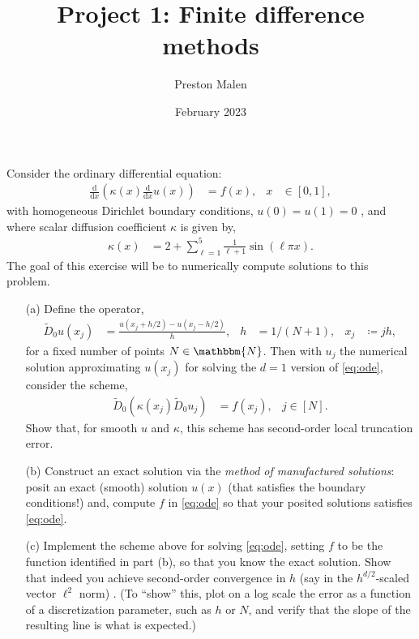 \documentclass[11pt,reqno]{amsart}
\title{Project 1: Finite difference methods}
\author{Preston Malen}
\date{February 2023}
\newcommand{\mathd}{\textrm{d}}
\newcommand{\ddx}[1]{\frac{\mathd}{\mathd #1}}
\newcommand{\N}{\mathbbm{N}}
\begin{document}
\maketitle

\noindent Consider the ordinary differential equation:
\begin{align}\label{eq:ode}
  \ddx{x} \left(\kappa(x) \ddx{x} u(x) \right) &= f(x), & x &\in [0,1],
\end{align}
with homogeneous Dirichlet boundary conditions, $u(0) = u(1) = 0$ , and where scalar diffusion coefficient $\kappa$ is given by,
  \begin{align*}
    \kappa(x) &= 2 + \sum_{\ell=1}^{5} \frac{1}{\ell+1} \sin( \ell \pi x ).
  \end{align*}
  The goal of this exercise will be to numerically compute solutions to this problem. \\[8pt]
  \begin{itemize}
    \item[(a)] Define the operator,
      \begin{align*}
        \widetilde{D}_0 u(x_j) &= \frac{u(x_j + h/2) - u(x_j - h/2)}{h}, & h &= 1/(N+1), & x_j &\coloneqq j h,
      \end{align*}
      for a fixed number of points $N \in \N$. Then with $u_j$ the numerical solution approximating $u(x_j)$ for solving the $d=1$ version of \eqref{eq:ode}, consider the scheme,
      \begin{align}\label{eq:D0-def}
        \widetilde{D}_0 \left( \kappa(x_j) \widetilde{D}_0 u_j \right) &= f(x_j), & j \in [N].
      \end{align}
      Show that, for smooth $u$ and $\kappa$, this scheme has second-order local truncation error.
    \item[(b)] Construct an exact solution via the \textit{method of manufactured solutions}: posit an exact (smooth) solution $u(x)$ (that satisfies the boundary conditions!) and, compute $f$ in \eqref{eq:ode} so that your posited solutions satisfies \eqref{eq:ode}.
    \item[(c)] Implement the scheme above for solving \eqref{eq:ode}, setting $f$ to be the function identified in part (b), so that you know the exact solution. Show that indeed you achieve second-order convergence in $h$ (say in the $h^{d/2}$-scaled vector $\ell^2$ norm) . (To ``show'' this, plot on a log scale the error as a function of a discretization parameter, such as $h$ or $N$, and verify that the slope of the resulting line is what is expected.)
  \end{itemize}
\newpage
\end{document}

